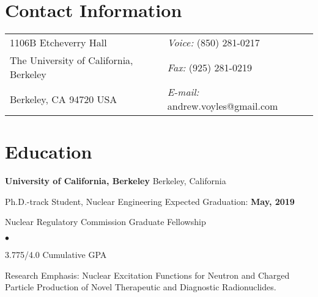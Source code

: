 \documentclass[margin,line]{res}
\newenvironment{list1}{
  \begin{list}{\ding{113}}{%
      \setlength{\itemsep}{0in}
      \setlength{\parsep}{0in} \setlength{\parskip}{0in}
      \setlength{\topsep}{0in} \setlength{\partopsep}{0in} 
      \setlength{\leftmargin}{0.17in}}}{\end{list}}
\newenvironment{list2}{
  \begin{list}{$\bullet$}{%
      \setlength{\itemsep}{0in}
      \setlength{\parsep}{0in} \setlength{\parskip}{0in}
      \setlength{\topsep}{0in} \setlength{\partopsep}{0in} 
      \setlength{\leftmargin}{0.2in}}}{\end{list}}
\begin{document}

\begin{resume}
\section{\sc Contact Information}
\begin{tabular}{@{}p{2.5in}p{3in}}
1106B Etcheverry Hall            & {\it Voice:}  (850) 281-0217 \\            
The University of California, Berkeley   & {\it Fax:}    (925) 281-0219 \\         
Berkeley, CA  94720 USA       & {\it E-mail:}  andrew.voyles@gmail.com\\       

\end{tabular}






\section{\sc Education}
{\bf University of California, Berkeley}  \hfill{ Berkeley, California}

\begin{list1}
\item[] Ph.D.-track Student, Nuclear Engineering \hfill { Expected Graduation: \textbf{May, 2019}}
\item[] Nuclear Regulatory Commission Graduate Fellowship 
\begin{list2}
\vspace*{.05in}
\item 3.775/4.0 Cumulative GPA
\item Research Emphasis: Nuclear Excitation Functions for Neutron and Charged Particle Production of Novel Therapeutic and Diagnostic Radionuclides.
\end{list2}
\end{list1}




\end{resume}
\end{document}
